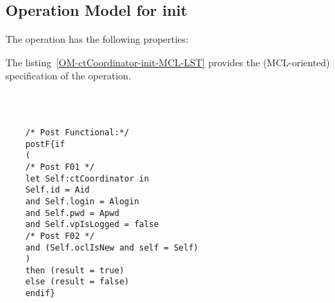 \subsection{Operation Model for init}

\label{OM-init}


The  operation has the following properties:

	\begin{operationmodel}



		


	\end{operationmodel}



	\vspace{1cm}
	The listing~\ref{OM-ctCoordinator-init-MCL-LST} provides the \msrmessir (MCL-oriented) specification of the operation.
	
	\scriptsize
	\vspace{0.5cm}
	\begin{lstlisting}[style=MessirStyle,firstnumber=auto,captionpos=b,caption={\msrmessir (MCL-oriented) specification of the operation \emph{init}.},label=OM-ctCoordinator-init-MCL-LST]

	
	
	/* Post Functional:*/ 
	postF{if
	(
	/* Post F01 */
	let Self:ctCoordinator in
	Self.id = Aid
	and Self.login = Alogin
	and Self.pwd = Apwd
	and Self.vpIsLogged = false
	/* Post F02 */
	and (Self.oclIsNew and self = Self)
	)
	then (result = true)
	else (result = false)
	endif}
	
	
	\end{lstlisting}
	\normalsize 
	
	
	
	





